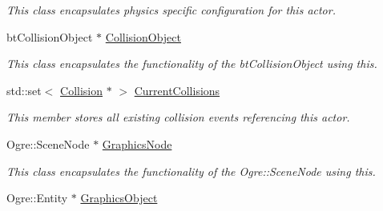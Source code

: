 \begin{DoxyCompactItemize}
\begin{DoxyCompactList}\small\item\em This class encapsulates physics specific configuration for this actor. \item\end{DoxyCompactList}\item 
\hypertarget{classMezzanine_1_1ActorBase_a453166e089f7a3821bf099e4404c3e43}{
btCollisionObject $\ast$ \hyperlink{classMezzanine_1_1ActorBase_a453166e089f7a3821bf099e4404c3e43}{CollisionObject}}
\label{classMezzanine_1_1ActorBase_a453166e089f7a3821bf099e4404c3e43}

\begin{DoxyCompactList}\small\item\em This class encapsulates the functionality of the btCollisionObject using this. \item\end{DoxyCompactList}\item 
\hypertarget{classMezzanine_1_1ActorBase_a5673816f3372d3ea8313687ad2529d08}{
std::set$<$ \hyperlink{classMezzanine_1_1Collision}{Collision} $\ast$ $>$ \hyperlink{classMezzanine_1_1ActorBase_a5673816f3372d3ea8313687ad2529d08}{CurrentCollisions}}
\label{classMezzanine_1_1ActorBase_a5673816f3372d3ea8313687ad2529d08}

\begin{DoxyCompactList}\small\item\em This member stores all existing collision events referencing this actor. \item\end{DoxyCompactList}\item 
\hypertarget{classMezzanine_1_1ActorBase_ac0a8cda5141e05df03a31f8b9b5908a6}{
Ogre::SceneNode $\ast$ \hyperlink{classMezzanine_1_1ActorBase_ac0a8cda5141e05df03a31f8b9b5908a6}{GraphicsNode}}
\label{classMezzanine_1_1ActorBase_ac0a8cda5141e05df03a31f8b9b5908a6}

\begin{DoxyCompactList}\small\item\em This class encapsulates the functionality of the Ogre::SceneNode using this. \item\end{DoxyCompactList}\item 
\hypertarget{classMezzanine_1_1ActorBase_ab28b13559f01195a5f81768a445e5119}{
Ogre::Entity $\ast$ \hyperlink{classMezzanine_1_1ActorBase_ab28b13559f01195a5f81768a445e5119}{GraphicsObject}}
\label{classMezzanine_1_1ActorBase_ab28b13559f01195a5f81768a445e5119}


\end{DoxyCompactItemize}
